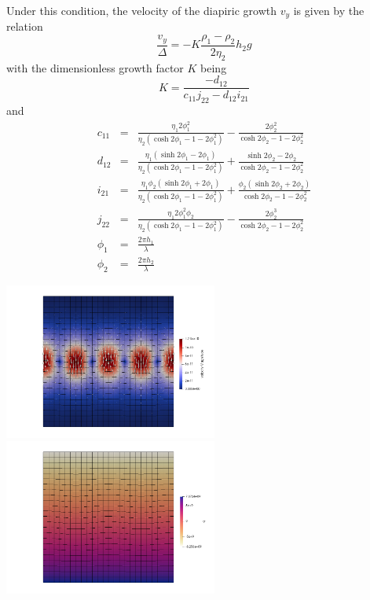 Under this condition, the velocity of the diapiric growth
$v_y$ is given by the relation
\[
\frac{v_y}{\Delta} = - K \frac{\rho_1-\rho_2}{2 \eta_2} h_2 g
\]
with the dimensionless growth factor $K$ being
\[
K=\frac{-d_{12}}{c_{11}j_{22}-d_{12}i_{21}}
\]
and 
\begin{eqnarray}
c_{11} &=& \frac{\eta_1 2 \phi_1^2}{\eta_2(\cosh 2\phi_1 - 1 - 2\phi_1^2)} - \frac{2\phi_2^2}{\cosh 2\phi_2 - 1 - 2 \phi_2^2}\\
d_{12} &=& \frac{\eta_1(\sinh 2\phi_1 -2\phi_1)}{\eta_2(\cosh 2\phi_1 -1 -2\phi_1^2)} + \frac{\sinh 2\phi_2 - 2\phi_2}{\cosh 2\phi_2 -1 -2\phi_2^2} \\
i_{21} &=& \frac{\eta_1\phi_2 (\sinh 2 \phi_1 + 2 \phi_1)}{\eta_2(\cosh 2\phi_1 -1 -2\phi_1^2)} 
+ \frac{\phi_2 (\sinh 2\phi_2 + 2\phi_2)}{\cosh 2\phi_2 -1 -2\phi_2^2} \\
j_{22} &=& \frac{\eta_1 2 \phi_1^2 \phi_2}{\eta_2(\cosh 2\phi_1 -1-2\phi_1^2)} - \frac{2\phi_2^3}{ \cosh 2\phi_2 -1 -2\phi_2^2}\\
\phi_1&=&\frac{2\pi h_1}{\lambda}\\
\phi_2&=&\frac{2\pi h_2}{\lambda}
\end{eqnarray}


\begin{center}
\includegraphics[width=7cm]{python_codes/fieldstone_40/images/vel}
\includegraphics[width=7cm]{python_codes/fieldstone_40/images/p}
\end{center}


